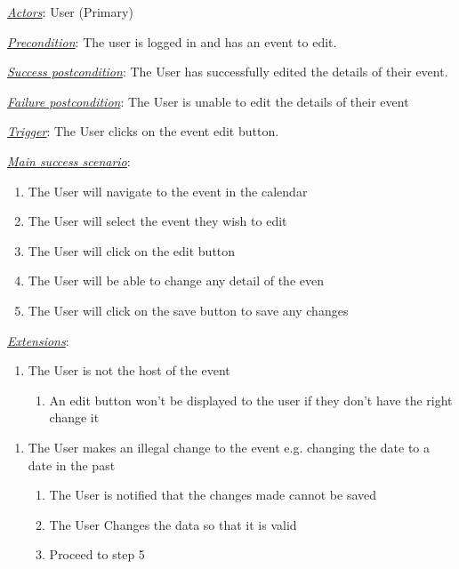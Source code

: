 \documentclass[a4paper]{article}
\begin{document}
\underline{\textit{Actors}}: User (Primary)

\underline{\textit{Precondition}}: The user is logged in and has an event to edit.

\underline{\textit{Success postcondition}}: The User has successfully edited the details of their event.

\underline{\textit{Failure postcondition}}: The User is unable to edit the details of their event

\underline{\textit{Trigger}}: The User clicks on the event edit button.


\underline{\textit{Main success scenario}}: 
\begin{enumerate}[leftmargin = 3em]
    \item The User will navigate to the event in the calendar
    \item The User will select the event they wish to edit
    \item The User will click on the edit button
    \item The User will be able to change any detail of the even
    \item The User will click on the save button to save any changes
\end{enumerate} 

\underline{\textit{Extensions}}:
\begin{enumerate}[label=3\alph*, leftmargin = 3em]
    \item The User is not the host of the event \begin{enumerate}[label=\arabic*.]
        \item An edit button won’t be displayed to the user if they don’t have the right change it
    \end{enumerate}
\end{enumerate}

\begin{enumerate}[label=4\alph*, leftmargin = 3em]
    \item The User makes an illegal change to the event e.g. changing the date to a date in the past \begin{enumerate}[label=\arabic*.]
        \item The User is notified that the changes made cannot be saved
        \item The User Changes the data so that it is valid
        \item Proceed to step 5
    \end{enumerate}
\end{enumerate}
\end{document}
